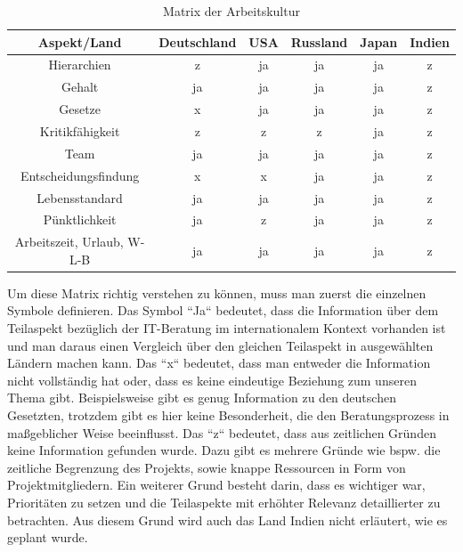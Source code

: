 \begin{table}[htp]
\begin{tabular}{|c|c|c|c|c|c|}
\hline  Aspekt/Land& Deutschland & USA & Russland & Japan & Indien \\ 
\hline 	Hierarchien  & z & ja & ja & ja &  z \\
\hline  Gehalt& ja & ja & ja & ja & z \\ 
\hline  Gesetze& x & ja & ja & ja & z  \\ 
\hline  Kritikfähigkeit& z & z & z & ja & z \\ 
\hline  Team& ja & ja & ja & ja & z\\ 
\hline  Entscheidungsfindung& x & x & ja & ja & z  \\ 
\hline  Lebensstandard& ja & ja & ja & ja & z \\ 
\hline  Pünktlichkeit& ja & z & ja & ja & z\\ 
\hline  Arbeitszeit, Urlaub, W-L-B& ja & ja & ja & ja & z\\ 
\hline 
\end{tabular} 
\caption{Matrix der Arbeitskultur}
\end{table}
Um diese Matrix richtig verstehen zu können, muss man zuerst die einzelnen Symbole definieren. Das Symbol ``Ja`` bedeutet, dass die Information über dem Teilaspekt bezüglich der IT-Beratung im internationalem Kontext vorhanden ist und man daraus einen Vergleich über den gleichen Teilaspekt in ausgewählten Ländern machen kann. Das ``x`` bedeutet, dass man entweder die Information nicht vollständig hat oder, dass es keine eindeutige Beziehung zum unseren Thema gibt. Beispielsweise gibt es genug Information zu den deutschen Gesetzten, trotzdem gibt es hier keine Besonderheit, die den Beratungsprozess in maßgeblicher Weise beeinflusst. Das ``z`` bedeutet, dass aus zeitlichen Gründen keine Information gefunden wurde. Dazu gibt es mehrere Gründe wie bspw. die zeitliche Begrenzung des Projekts, sowie knappe Ressourcen in Form von Projektmitgliedern. Ein weiterer Grund besteht darin, dass es wichtiger war,  Prioritäten zu setzen und die Teilaspekte mit erhöhter Relevanz detaillierter zu betrachten. Aus diesem Grund wird auch das Land Indien nicht erläutert, wie es geplant wurde.\\ \\
